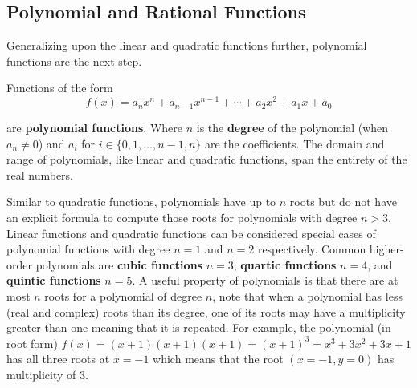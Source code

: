 \subsection{Polynomial and Rational Functions}
Generalizing upon the linear and quadratic functions further, polynomial functions are the next step.

\begin{definition}
    Functions of the form
    \begin{equation}
        f(x) = a_n x^n + a_{n-1} x^{n-1} + \cdots + a_2 x^2 + a_1 x + a_0
    \end{equation}

    \noindent are \textbf{polynomial functions}. Where $n$ is the \textbf{degree} of the polynomial (when $a_n \neq 0$) and $a_i$ for $i \in \{0,1,\dots,n-1,n\}$ are the coefficients. The domain and range of polynomials, like linear and quadratic functions, span the entirety of the real numbers.
\end{definition}

Similar to quadratic functions, polynomials have up to $n$ roots but do not have an explicit formula to compute those roots for polynomials with degree $n > 3$. Linear functions and quadratic functions can be considered special cases of polynomial functions with degree $n=1$ and $n=2$ respectively. Common higher-order polynomials are \textbf{cubic functions} $n=3$, \textbf{quartic functions} $n=4$, and \textbf{quintic functions} $n=5$. A useful property of polynomials is that there are at most $n$ roots for a polynomial of degree $n$, note that when a polynomial has less (real and complex) roots than its degree, one of its roots may have a multiplicity greater than one meaning that it is repeated. For example, the polynomial (in root form) $f(x) = (x+1)(x+1)(x+1) = (x+1)^3 = x^3 + 3x^2 + 3x + 1$ has all three roots at $x=-1$ which means that the root $(x=-1,y=0)$ has multiplicity of 3.

